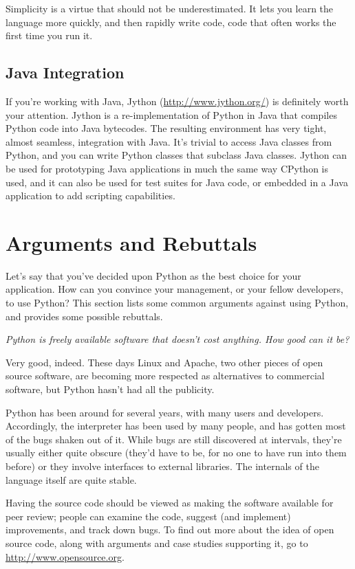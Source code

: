 \documentclass{howto}
\begin{document}
Simplicity is a virtue that should not be underestimated.  It lets you
learn the language more quickly, and then rapidly write code, code
that often works the first time you run it.

 \subsection{Java Integration}

If you're working with Java, Jython
(\url{http://www.jython.org/}) is definitely worth your
attention.  Jython is a re-implementation of Python in Java that
compiles Python code into Java bytecodes.  The resulting environment
has very tight, almost seamless, integration with Java.  It's trivial
to access Java classes from Python, and you can write Python classes
that subclass Java classes.  Jython can be used for prototyping Java
applications in much the same way CPython is used, and it can also be
used for test suites for Java code, or embedded in a Java application
to add scripting capabilities.  

\section{Arguments and Rebuttals}

Let's say that you've decided upon Python as the best choice for your
application.  How can you convince your management, or your fellow
developers, to use Python?  This section lists some common arguments
against using Python, and provides some possible rebuttals.

\emph{Python is freely available software that doesn't cost anything.
How good can it be?}

Very good, indeed.  These days Linux and Apache, two other pieces of
open source software, are becoming more respected as alternatives to
commercial software, but Python hasn't had all the publicity.

Python has been around for several years, with many users and
developers.  Accordingly, the interpreter has been used by many
people, and has gotten most of the bugs shaken out of it.  While bugs
are still discovered at intervals, they're usually either quite
obscure (they'd have to be, for no one to have run into them before)
or they involve interfaces to external libraries.  The internals of
the language itself are quite stable.

Having the source code should be viewed as making the software
available for peer review; people can examine the code, suggest (and
implement) improvements, and track down bugs.  To find out more about
the idea of open source code, along with arguments and case studies
supporting it, go to \url{http://www.opensource.org}.
\end{document}
